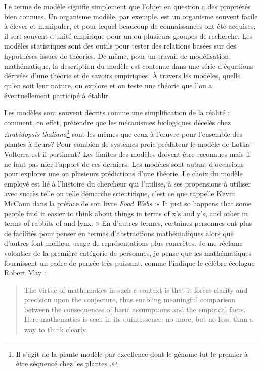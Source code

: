 Le terme de modèle signifie simplement que l'objet en question a des
propriétés bien connues. Un organisme modèle, par exemple, est un
organisme souvent facile à élever et manipuler, et pour lequel beaucoup
de connaissances ont été acquises; il sert souvent d'unité empirique
pour un ou plusieurs groupes de recherche. Les modèles statistiques sont
des outils pour tester des relations basées sur des hypothèses issues de
théories. De même, pour un travail de modélisation mathématique, la
description du modèle est contenue dans une série d'équations dérivées
d'une théorie et de savoirs empiriques. À travers les modèles, quelle
qu'en soit leur nature, on explore et on teste une théorie que l'on a
éventuellement participé à établir.

Les modèles sont souvent décrits comme une simplification de la réalité
: comment, en effet, prétendre que les mécanismes biologiques décelés
chez \emph{Arabidopsis thaliana}\footnote{Il s'agit de la plante modèle
  par excellence dont le génome fut le premier à être séquencé chez les
  plantes \citep{TheArabidopsisGenomeInitiative2000}.} sont les mêmes
que ceux à l'œuvre pour l'ensemble des plantes à fleurs? Pour combien de
systèmes proie-prédateur le modèle de Lotka-Volterra est-il pertinent?
Les limites des modèles doivent être reconnues mais il ne faut pas nier
l'apport de ces derniers. Les modèles sont autant d'occasions pour
explorer une ou plusieurs prédictions d'une théorie. Le choix du modèle
employé est lié à l'histoire du chercheur qui l'utilise, à ses
propensions à utiliser avec succès telle ou telle démarche scientifique,
c'est ce que rappelle Kevin McCann dans la préface de son livre
\emph{Food Webs} \citep{mccann2011food} :« It just so happens that some
people find it easier to think about things in terms of x's and y's, and
other in terms of rabbits of and lynx. » En d'autres termes, certaines
personnes ont plus de facilités pour penser en termes d'abstractions
mathématiques alors que d'autres font meilleur usage de représentations
plus concrètes. Je me réclame volontier de la première catégorie de
personnes, je pense que les mathématiques fournissent un cadre de pensée
très puissant, comme l'indique le célèbre écologue Robert May
\citep[p.~791]{May2004} :

\begin{quote}
The virtue of mathematics in such a context is that it forces clarity
and precision upon the conjecture, thus enabling meaningful comparison
between the consequences of basic assumptions and the empirical facts.
Here mathematics is seen in its quintessence: no more, but no less, than
a way to think clearly.
\end{quote}


